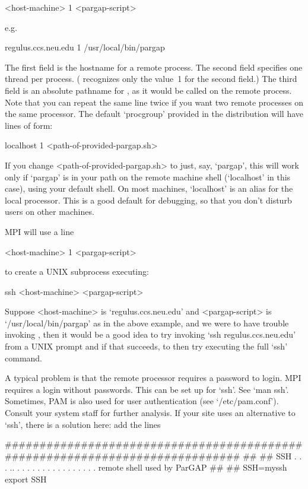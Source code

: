 <host-machine> 1 <pargap-script>

e.g.

\begintt
regulus.ccs.neu.edu 1 /usr/local/bin/pargap
\endtt

The first field is the hostname for a remote process.  The  second  field
specifies one thread per process. ({\ParGAP} recognizes only the  value~1
for the second field.) The  third  field  is  an  absolute  pathname  for
{\ParGAP}, as it would be called on the remote process. Note that you can
repeat the same line twice if you want two remote {\ParGAP} processes  on
the same processor. The default `procgroup' provided in the  distribution
will have lines of form:

localhost 1 <path-of-provided-pargap.sh>

If you change <path-of-provided-pargap.sh> to just, say,  `pargap',  this
will work only if `pargap' is in your path on the  remote  machine  shell
(`localhost' in this case), using your default shell. On  most  machines,
`localhost' is an alias for the local processor. This is a  good  default
for debugging, so that you don't disturb users on other machines.

MPI will use a line

<host-machine> 1 <pargap-script>

to create a UNIX subprocess executing:

ssh <host-machine> <pargap-script>

Suppose <host-machine> is `regulus.ccs.neu.edu'  and  <pargap-script>  is
`/usr/local/bin/pargap' as in the above example,  and  we  were  to  have
trouble invoking {\ParGAP}, then it would be a good idea to try  invoking
`ssh regulus.ccs.neu.edu' from a UNIX prompt and  if  that  succeeds,  to
then try executing the full `ssh' command.

A typical problem is that the remote processor  requires  a  password  to
login.   MPI   requires   a   login   without    passwords.    This   can
be set up for `ssh'.  See `man ssh'. Sometimes, PAM is also used for user
authentication (see `/etc/pam.conf').  Consult  your  system  staff   for
further analysis. If your site uses an alternative to `ssh', there  is  a
solution here: add the lines

\begintt
#############################################################################
##
##  SSH . . . .. . . . . . . . . . . . . . . . .  remote shell used by ParGAP
##
##
SSH=myssh
export SSH
\endtt

